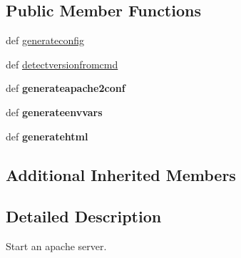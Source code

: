 \subsection*{Public Member Functions}
\begin{DoxyCompactItemize}
\item 
def \hyperlink{classcore_1_1services_1_1utility_1_1_http_service_a02593f8cd901826e79624723b3468a8e}{generateconfig}
\item 
def \hyperlink{classcore_1_1services_1_1utility_1_1_http_service_aeb0975c3ebc79a00ee20818075631cd3}{detectversionfromcmd}
\item 
\hypertarget{classcore_1_1services_1_1utility_1_1_http_service_a0f9c06ca7b7ca2f3c27bd0d1a3a8737e}{def {\bfseries generateapache2conf}}\label{classcore_1_1services_1_1utility_1_1_http_service_a0f9c06ca7b7ca2f3c27bd0d1a3a8737e}

\item 
\hypertarget{classcore_1_1services_1_1utility_1_1_http_service_acde984255b396dbdf79164e12d576ff4}{def {\bfseries generateenvvars}}\label{classcore_1_1services_1_1utility_1_1_http_service_acde984255b396dbdf79164e12d576ff4}

\item 
\hypertarget{classcore_1_1services_1_1utility_1_1_http_service_a196ad78ea56d6140f43892f93429c60e}{def {\bfseries generatehtml}}\label{classcore_1_1services_1_1utility_1_1_http_service_a196ad78ea56d6140f43892f93429c60e}

\end{DoxyCompactItemize}
\subsection*{Additional Inherited Members}


\subsection{Detailed Description}
\begin{DoxyVerb}Start an apache server.
\end{DoxyVerb}
 

